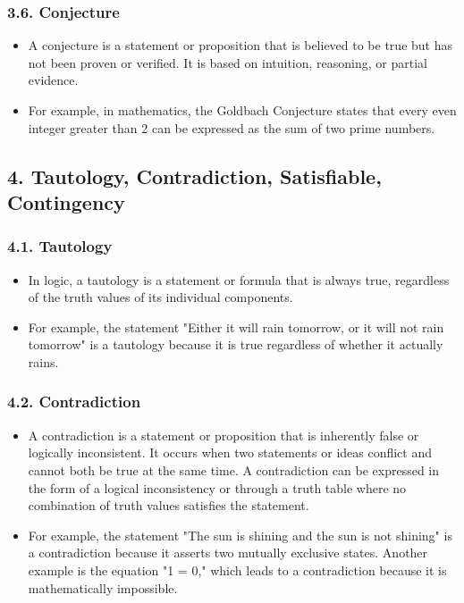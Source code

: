 \documentclass{article}
\begin{document}
\subsubsection*{3.6. Conjecture}
\begin{itemize}
\item A conjecture is a statement or proposition that is believed to be true but has not been proven or verified. It is based on intuition, reasoning, or partial evidence.
\item For example, in mathematics, the Goldbach Conjecture states that every even integer greater than 2 can be expressed as the sum of two prime numbers.
\end{itemize}
\subsection*{4. Tautology, Contradiction, Satisfiable, Contingency}
\subsubsection*{4.1. Tautology}
\begin{itemize}
\item In logic, a tautology is a statement or formula that is always true, regardless of the truth values of its individual components.
\item For example, the statement "Either it will rain tomorrow, or it will not rain tomorrow" is a tautology because it is true regardless of whether it actually rains.
\end{itemize}
\subsubsection*{4.2. Contradiction}
\begin{itemize}
\item A contradiction is a statement or proposition that is inherently false or logically inconsistent. It occurs when two statements or ideas conflict and cannot both be true at the same time. A contradiction can be expressed in the form of a logical inconsistency or through a truth table where no combination of truth values satisfies the statement.
\item For example, the statement "The sun is shining and the sun is not shining" is a contradiction because it asserts two mutually exclusive states. Another example is the equation "1 = 0," which leads to a contradiction because it is mathematically impossible.
\end{itemize}
\end{document}

